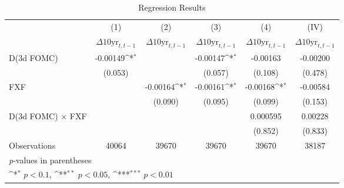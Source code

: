 \begin{table}[htbp]
    \centering
    \caption{Regression Results}
    \label{tab:output}
{
\def\sym#1{\ifmmode^{#1}\else\(^{#1}\)\fi}
\begin{tabular}{l*{5}{c}}
\hline\hline
                    &\multicolumn{1}{c}{(1)}&\multicolumn{1}{c}{(2)}&\multicolumn{1}{c}{(3)}&\multicolumn{1}{c}{(4)}&\multicolumn{1}{c}{(IV)}\\
                    &\multicolumn{1}{c}{$\Delta 10\textrm{yr}_{t,t-1}$}&\multicolumn{1}{c}{$\Delta 10\textrm{yr}_{t,t-1}$}&\multicolumn{1}{c}{$\Delta 10\textrm{yr}_{t,t-1}$}&\multicolumn{1}{c}{$\Delta 10\textrm{yr}_{t,t-1}$}&\multicolumn{1}{c}{$\Delta 10\textrm{yr}_{t,t-1}$}\\
\hline
D(3d FOMC)     &    -0.00149\sym{*}          &                     &    -0.00147\sym{*}          &    -0.00163       &    -0.00200         \\
                    &     (0.053)         &                     &     (0.057)         &   (0.108)         &     (0.478)         \\
[1em]
FXF              &                     &    -0.00164\sym{*}          &    -0.00161\sym{*}          &    -0.00168\sym{*}          &    -0.00584         \\
                    &                     &     (0.090)         &     (0.095)         &     (0.099)         &     (0.153)         \\
[1em]
D(3d FOMC) $\times$ FXF&                     &                     &                     &    0.000595         &     0.00228         \\
                    &                     &                     &                     &     (0.852)         &     (0.833)         \\

\hline
Observations        &       40064         &       39670         &       39670         &       39670         &       38187         \\
\hline\hline
\multicolumn{6}{l}{\footnotesize \textit{p}-values in parentheses}\\
\multicolumn{6}{l}{\footnotesize \sym{*} \(p<0.1\), \sym{**} \(p<0.05\), \sym{***} \(p<0.01\)}\\
\end{tabular}
}
\end{table}